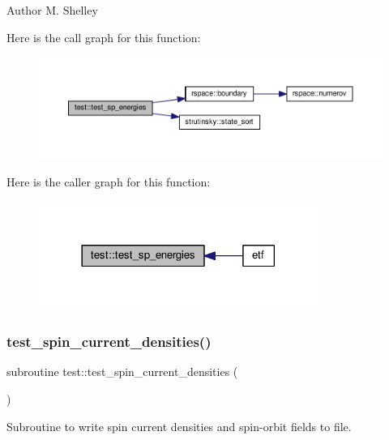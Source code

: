 \begin{DoxyAuthor}{Author}
M. Shelley 
\end{DoxyAuthor}
Here is the call graph for this function\+:
\nopagebreak
\begin{figure}[H]
\begin{center}
\leavevmode
\includegraphics[width=350pt]{namespacetest_abeb5e336395994821e96838b809e4140_cgraph}
\end{center}
\end{figure}
Here is the caller graph for this function\+:
\nopagebreak
\begin{figure}[H]
\begin{center}
\leavevmode
\includegraphics[width=258pt]{namespacetest_abeb5e336395994821e96838b809e4140_icgraph}
\end{center}
\end{figure}
\mbox{\label{namespacetest_a3e49a3b6fd835efb13dd446bfb6e8b1f}} 
\subsubsection{\texorpdfstring{test\+\_\+spin\+\_\+current\+\_\+densities()}{test\_spin\_current\_densities()}}
{\footnotesize\ttfamily subroutine test\+::test\+\_\+spin\+\_\+current\+\_\+densities (\begin{DoxyParamCaption}{ }\end{DoxyParamCaption})}



Subroutine to write spin current densities and spin-\/orbit fields to file. 

